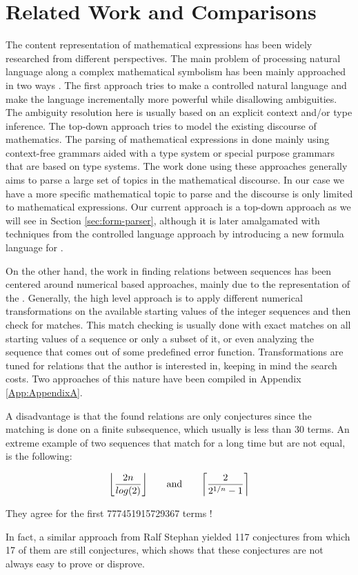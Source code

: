 \section{Related Work and Comparisons} \label{sec:Related}

The content representation of mathematical expressions has been widely researched from
different perspectives. The main problem of processing natural language along a complex
mathematical symbolism has been mainly approached in two ways \cite{Ginev-11}. The first
approach tries to make a controlled natural language and make the language incrementally
more powerful while disallowing ambiguities. The ambiguity resolution here is usually
based on an explicit context and/or type inference. The top-down approach tries to model
the existing discourse of mathematics.  The parsing of mathematical expressions in done
mainly using context-free grammars aided with a type system or special purpose grammars
that are based on type systems. The work done using these approaches generally aims to
parse a large set of topics in the mathematical discourse. In our case we have a more
specific mathematical topic to parse and the discourse is only limited to mathematical
expressions. Our current approach is a top-down approach as we will see in Section
\ref{sec:form-parser}, although it is later amalgamated with techniques from the
controlled language approach by introducing a new formula language for \oeis.

On the other hand, the work in finding relations between sequences has been centered
around numerical based approaches, mainly due to the representation of the
\oeis. Generally, the high level approach is to apply different numerical transformations
on the available starting values of the integer sequences and then check for matches. This
match checking is usually done with exact matches on all starting values of a sequence or
only a subset of it, or even analyzing the sequence that comes out of some predefined
error function. Transformations are tuned for relations that the author is interested in,
keeping in mind the search costs. Two approaches of this nature have been compiled in
Appendix \ref{App:AppendixA}.

A disadvantage is that the found relations are only conjectures since the matching is done on a finite subsequence,
which usually is less than 30 terms. An extreme example of two sequences that match for a long time but are not
equal, is the following:

$$\floor*{\frac{2n}{log(2)}}  \qquad\text{and}\qquad \ceil*{\frac{2}{2^{1/n}-1}}$$

They agree for the first 777451915729367 terms \cite{oeis-paper2}!

In fact, a similar approach from Ralf Stephan \cite{Ralf} yielded 117 conjectures from which 17 of them are still
conjectures\cite{RalfUpdates},  which shows that these conjectures are not always easy to prove or disprove.


